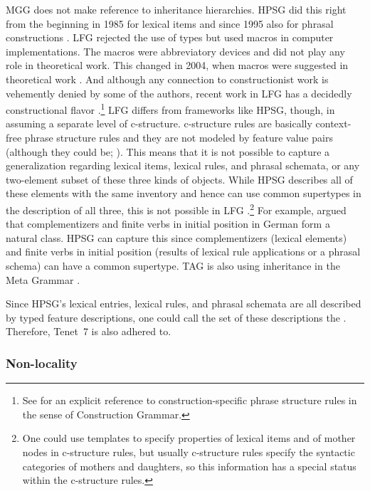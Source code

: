 \documentclass[output=paper
	        ,collection
	        ,collectionchapter
 	        ,biblatex
                ,babelshorthands
                ,newtxmath
                ,draftmode
                ,colorlinks, citecolor=brown
]{langscibook}
\begin{document}
MGG does not make reference to inheritance hierarchies. HPSG did this right from the beginning in 1985 \citep{FPW85a} for lexical items and
since 1995 also for phrasal constructions \citep{Sag97a}. LFG rejected the use of types but used
macros in computer implementations. The macros were abbreviatory devices and did not play any role in
theoretical work. This changed in 2004, when macros were suggested in theoretical work
\citep*{DKK2004a}. And although any connection to constructionist work is vehemently denied by some
of the authors, recent work in LFG has a decidedly constructional flavor
\citep*{ADT2008a,AGT2014a}.\footnote{
  See \citet[]{Toivonen2013a} for an explicit reference to construction-specific phrase
  structure rules in the sense of Construction Grammar.
}
LFG differs from frameworks like HPSG, though, in assuming a separate level of
c-structure. c-structure rules are basically context-free phrase structure rules and they are not
modeled by feature value pairs (although they could be; \citealt{Kaplan95a}). This means that it is not
possible to capture a generalization regarding lexical items, lexical rules, and phrasal
schemata, or any two-element subset of these three kinds of objects. While HPSG describes all of
these elements with the same inventory and hence can use common supertypes in the description of all
three, this is not possible in LFG \citep[Section~23.1]{MuellerGT-Eng2}.\footnote{
  One could use templates \citep{DKK2004a,ADT2013a} to specify properties of lexical items and of mother nodes in c-structure
  rules, but usually c-structure rules specify the syntactic categories of mothers and daughters, so
  this information has a special status within the c-structure rules.
} For example, \citet{Hoehle97a} argued that
complementizers and finite verbs in initial position in German form a natural class. HPSG can
capture this since complementizers (lexical elements) and finite verbs in initial position (results
of lexical rule applications or a phrasal schema) can have a common supertype.
TAG is also using inheritance in the Meta Grammar \citep{LK2017a}.

Since HPSG's lexical entries, lexical rules, and phrasal schemata are all described by typed feature
descriptions, one could call the set of these descriptions the . Therefore,
Tenet~7 is also adhered to. 

\subsubsection{Non-locality}
\label{sec-non-locality}
\end{document}
